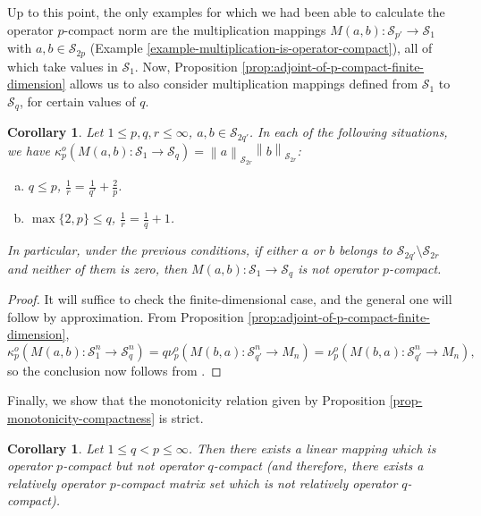 \documentclass[11pt]{amsart}
\newcommand{\n}[1]{ \left\|#1\right\| }
\newtheorem{corollary}[theorem]{Corollary}
\numberwithin{equation}{section}
\begin{document}
Up to this point, the only examples for which we had been able to calculate the operator $p$-compact norm are the multiplication mappings $M(a,b) : \mathcal{S}_{p'} \to \mathcal{S}_1$ with $a,b \in \mathcal{S}_{2p}$ (Example \ref{example-multiplication-is-operator-compact}), all of which take values in $\mathcal{S}_1$. Now, Proposition \ref{prop:adjoint-of-p-compact-finite-dimension} allows us to also consider multiplication mappings defined from $\mathcal{S}_1$ to $\mathcal{S}_q$, for certain values of $q$.


\begin{corollary}\label{cor-examples-p-compact}
Let $1\le p, q, r \le \infty$, $a,b \in \mathcal{S}_{2q'}$. In each of the following situations, we have ${\kappa_p^o(M(a,b) : \mathcal{S}_1 \to \mathcal{S}_q)} = \n{a}_{\mathcal{S}_{2r}} \n{b}_{\mathcal{S}_{2r}}$:
\begin{enumerate}[(a)]
\item $q \le p$, $\frac{1}{r} = \frac{1}{q'}+\frac2p$.
\item $\max\{2,p\} \le q$, $\frac{1}{r} = \frac1q+1$. 
\end{enumerate}
In particular, under the previous conditions, if either $a$ or $b$ belongs to $\mathcal{S}_{2q'} \setminus \mathcal{S}_{2r}$ and neither of them is zero, then $M(a,b) : \mathcal{S}_1 \to \mathcal{S}_q$ is not operator $p$-compact.
\end{corollary}

\begin{proof}
It will suffice to check the finite-dimensional case, and the general one will follow by approximation.
From Proposition \ref{prop:adjoint-of-p-compact-finite-dimension},
\[
\kappa_p^o(M(a,b) : \mathcal{S}_1^n \to \mathcal{S}_q^n) = q\nu^o_p(M(b,a): \mathcal{S}_{q'}^n \to M_n) =  \nu^o_p(M(b,a): \mathcal{S}_{q'}^n \to M_n), 
\]
so the conclusion now follows from \cite[Thm. 3.1]{Oikhberg}.
\end{proof}



Finally, we show that the monotonicity relation given by Proposition \ref{prop-monotonicity-compactness} is strict.

\begin{corollary} \label{cor: p-not-q}
Let $1 \le q < p \le \infty$. Then there exists a linear mapping which is operator $p$-compact but not operator $q$-compact (and therefore, there exists a relatively operator $p$-compact matrix set which is not relatively operator $q$-compact).
\end{corollary}
\end{document}
